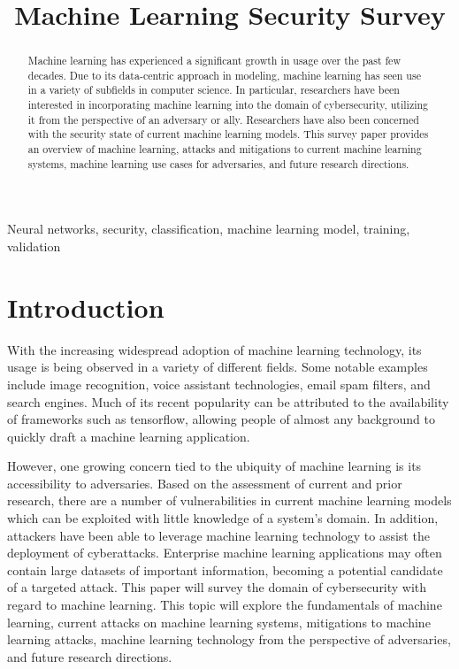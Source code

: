 \documentclass[11pt,conference]{IEEEtran}
\begin{document}
\title{Machine Learning Security Survey \\
}

\author{
}

\maketitle

\begin{abstract}
Machine learning has experienced a significant growth in usage 
over the past few decades. Due to its data-centric approach in modeling, 
machine learning has seen use in a variety of subfields in computer science. In
particular, researchers have been interested in incorporating machine learning
into the domain of cybersecurity, utilizing it from the perspective of an
adversary or ally. Researchers have also been concerned with the security state
of current machine learning models. This survey paper provides an overview of
machine learning, attacks and mitigations to current machine learning
    systems, machine learning use cases for adversaries, and future research
    directions.
\end{abstract}

\begin{IEEEkeywords}
Neural networks, security, classification, machine learning model, training,
    validation
\end{IEEEkeywords}

\section{Introduction}
With the increasing widespread adoption of machine learning technology, its
usage is being observed in a variety of different fields. Some notable examples
include image recognition, voice assistant technologies, email spam filters, and search
engines. Much of its recent popularity can be attributed to the availability of
frameworks such as tensorflow, allowing people of almost any background to
quickly draft a machine learning application.

However, one growing concern tied to the ubiquity of machine learning is its 
accessibility to adversaries. Based on the assessment of current and prior
research, there are a number of vulnerabilities in current machine learning
models which can be exploited with little knowledge of a system's domain. In
addition, attackers have been able to leverage machine learning technology to
assist the deployment of cyberattacks. Enterprise machine learning applications
may often contain large datasets of important information, becoming a potential 
candidate of a targeted attack. This paper will survey the domain of
cybersecurity with regard to machine learning. This topic will explore the
fundamentals of machine learning, current attacks on machine learning
systems, mitigations to machine learning attacks, machine learning technology from the perspective of adversaries, and
future research directions.
\end{document}
